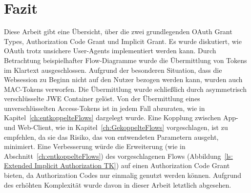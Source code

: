 \chapter{Fazit}
Diese Arbeit gibt eine Übersicht, über die zwei grundlegenden OAuth Grant Types,
Authorization Code Grant und Implicit Grant. Es wurde diskutiert, wie OAuth
trotz unsichere User-Agents implementiert werden kann. Durch Betrachtung
beispielhafter Flow-Diagramme wurde die Übermittlung von Tokens im Klartext
ausgeschlossen. Aufgrund der besonderen Situation, dass die Websession zu Beginn
nicht auf den Nutzer bezogen werden kann, wurden auch MAC-Tokens verworfen. Die
Übermittlung wurde schließlich durch asymmetrisch verschlüsselte JWE Container
gelöst. Von der Übermittlung eines unverschlüsselten Access-Tokens ist in jedem
Fall abzuraten, wie in Kapitel~\ref{ch:entkoppelteFlows} dargelegt wurde. Eine
Kopplung zwischen App- und Web-Client, wie in Kapitel~\ref{ch:GekoppelteFlows}
vorgeschlagen, ist zu empfehlen, da sie das Risiko, das von entwendeten
Parametern ausgeht, minimiert. Eine Verbesserung würde die Erweiterung (wie in
Abschnitt~\ref{ch:entkoppelteFlows}) des vorgeschlagenen Flows
(Abbildung~\ref{ls: Extended Implicit Authorization TK}) auf einen Authorization
Code Grant bieten, da Authorization Codes nur einmalig genutzt werden können.
Aufgrund des erhöhten Komplexität wurde davon in dieser Arbeit letztlich
abgesehen.
